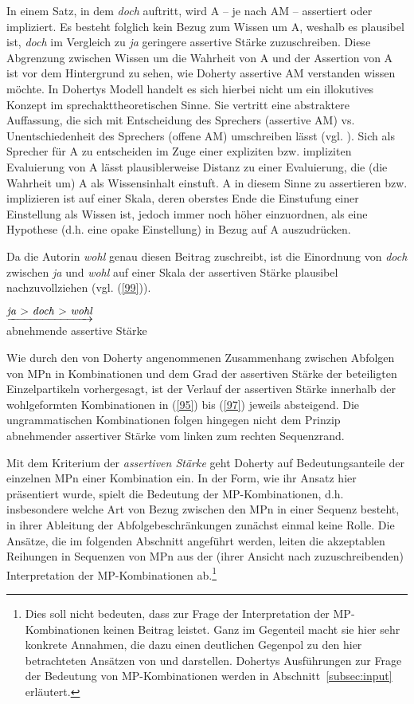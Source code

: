 In einem Satz, in dem \textit{doch} auftritt, wird A – je nach AM – assertiert oder impliziert. Es besteht folglich kein Bezug zum Wissen um A, weshalb es plausibel ist, \textit{doch} im Vergleich zu \textit{ja} geringere assertive Stärke zuzuschreiben. Diese Abgrenzung zwischen Wissen um die Wahrheit von A und der Assertion von A ist  vor dem Hintergrund zu sehen, wie Doherty assertive AM verstanden wissen möchte. In Dohertys Modell handelt es sich hierbei nicht um ein illokutives Konzept im sprechakttheoretischen Sinne. Sie vertritt eine abstraktere Auffassung, die sich mit \glq Entscheidung\grq {} des Sprechers (assertive AM) vs. \glq Unentschiedenheit\grq {} des Sprechers (offene AM) umschreiben lässt (vgl. \citealt[19]{Doherty1987}). Sich als Sprecher für A zu entscheiden im Zuge einer expliziten bzw. impliziten Evaluie\-rung von A lässt plausiblerweise Distanz zu einer Evaluierung, die (die Wahrheit um) A als Wissensinhalt einstuft. A in diesem Sinne zu assertieren bzw. implizieren ist auf einer Skala, deren oberstes Ende die Einstufung einer Einstellung als Wissen ist, jedoch immer noch höher einzuordnen, als eine Hypothese (d.h. eine opake Einstellung) in Bezug auf A auszudrücken. 

Da die Autorin\textit{ wohl} genau diesen Beitrag zuschreibt, ist die Einordnung von \textit{doch} zwischen \textit{ja} und \textit{wohl} auf einer Skala der assertiven Stärke  plausibel nachzuvollziehen (vgl. (\ref{99})).

\begin{exe}
	\ex\label{99} 
	$\underrightarrow{\text{\textit{ja} > \textit{doch} > \textit{wohl}}}$\\
	abnehmende assertive Stärke
\end{exe}
Wie durch den von Doherty angenommenen Zusammenhang zwischen Abfolgen von MPn in Kombinationen und dem Grad der assertiven Stärke der beteiligten Einzelpartikeln vorhergesagt, ist der Verlauf der assertiven Stärke innerhalb der wohlgeformten Kombinationen in (\ref{95}) bis (\ref{97}) jeweils absteigend. Die ungrammatischen Kombinationen folgen hingegen nicht dem Prinzip abnehmender assertiver Stärke vom linken zum rechten Sequenzrand.

Mit dem Kriterium der \textit{assertiven Stärke} geht Doherty auf Bedeutungsanteile der einzelnen MPn einer Kombination ein. In der Form, wie ihr Ansatz hier präsentiert wurde, spielt die Bedeutung der MP-Kombinationen, d.h. insbesondere welche Art von Bezug zwischen den MPn in einer Sequenz besteht, in ihrer Ableitung der Abfolgebeschränkungen zunächst einmal keine Rolle. Die Ansätze, die im folgenden Abschnitt angeführt werden, leiten die akzeptablen Reihungen in Sequenzen von MPn aus der (ihrer Ansicht nach zuzuschreibenden) Interpretation der MP-Kombinationen ab.\footnote{Dies soll nicht bedeuten, dass \citet{Doherty1985, Doherty1987} zur Frage der Interpretation der MP-Kombinationen keinen Beitrag leistet. Ganz im Gegenteil macht sie hier sehr konkrete Annahmen, die dazu einen deutlichen Gegenpol zu den hier betrachteten Ansätzen von \citet{Ormelius-Sandblom1997} und \citet{Rinas2006, Rinas2007} darstellen. Dohertys Ausführungen zur Frage der Bedeutung von MP-Kombinationen werden in Abschnitt~\ref{subsec:input} erläutert.}

